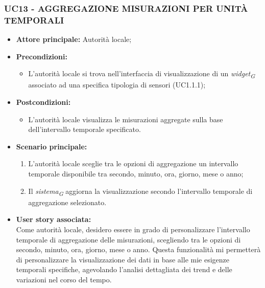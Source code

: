 \subsubsection{UC13 - AGGREGAZIONE MISURAZIONI PER UNITÀ TEMPORALI}
\begin{itemize}
    \item \textbf{Attore principale:} Autorità locale;
    \item \textbf{Precondizioni:}
            \begin{itemize}
                \item L'autorità locale si trova nell'interfaccia di visualizzazione di un \textit{widget}\textsubscript{\textit{G}} associato ad una specifica tipologia di sensori (UC1.1.1); 
            \end{itemize}
    \item \textbf{Postcondizioni:}
          \begin{itemize}
              \item L'autorità locale visualizza le misurazioni aggregate sulla base dell'intervallo temporale specificato.
          \end{itemize}
    \item \textbf{Scenario principale:}
          \begin{enumerate}
             \item L'autorità locale sceglie tra le opzioni di aggregazione un intervallo temporale disponibile tra secondo, minuto, ora, giorno, mese o anno;
             \item Il \textit{sistema}\textsubscript{\textit{G}} aggiorna la visualizzazione secondo l'intervallo temporale di aggregazione selezionato.
          \end{enumerate}
    \item \textbf{User story associata:} \\
        Come autorità locale, desidero essere in grado di personalizzare l'intervallo temporale di aggregazione delle misurazioni, scegliendo tra le opzioni di secondo, minuto, ora, giorno, mese o anno. Questa funzionalità mi permetterà di personalizzare la visualizzazione dei dati in base alle mie esigenze temporali specifiche, agevolando l'analisi dettagliata dei trend e delle variazioni nel corso del tempo.
\end{itemize}